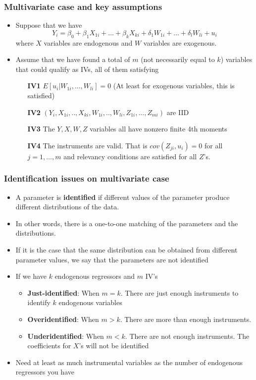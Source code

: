 \documentclass[aspectratio=169]{beamer}
\begin{document}
\begin{frame}
\frametitle{Multivariate case and key assumptions}
\begin{itemize}
\item Suppose that we have
\[
Y_i = \beta_0 + \beta_1X_{1i} +...+ \beta_kX_{ki} + \delta_1W_{1i}+...+\delta_lW_{li}+u_i 
\]
where $X$ variables are endogenous and $W$ variables are exogenous. 
\item Assume that we have found a total of $m$ (not necessarily equal to $k$) variables that could qualify as IVs, all of them satisfying 
\begin{itemize}
\item[\textbf{IV1}] $E[u_i|W_{1i},...,W_{li}]=0$ (At least for exogenous variables, this is satisfied)
\item[\textbf{IV2}] $(Y_i,X_{1i},..,X_{ki},W_{1i},..,W_{li},Z_{1i},...,Z_{mi})$ are IID
\item[\textbf{IV3}] The $Y,X,W,Z$ variables all have nonzero finite 4th moments
\item[\textbf{IV4}] The instruments are valid. That is $cov(Z_{ji},u_i)=0$ for all $j=1,...,m$ and relevancy conditions are satisfied for all $Z$'s. 
\end{itemize}
\end{itemize}
\end{frame}

\begin{frame}
\frametitle{Identification issues on multivariate case}
\begin{itemize}
\item A parameter is \textbf{identified} if different values of the parameter produce different distributions of the data. 
\item In other words, there is a one-to-one matching of the parameters and the distributions.
\item If it is the case that the same distribution can be obtained from different parameter values, we say that the parameters are not identified
\item If we have $k$ endogenous regressors and $m$ IV's
\begin{itemize}
\item \textbf{Just-identified}: When $m=k$. There are just enough instruments to identify $k$ endogenous variables
\item \textbf{Overidentified}: When $m>k$. There are more than enough instruments.\item \textbf{Underidentified}: When $m<k$. There are not enough instruments. The coefficients for $X$'s will not be identified 
\end{itemize}
\item Need at least as much instrumental variables as the number of endogenous regressors you have
\end{itemize}
\end{frame}
\end{document}
